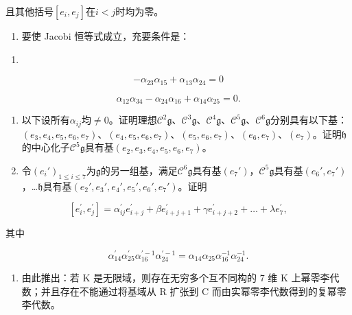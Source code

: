 且其他括号\([e_i, e_j]\)在\(i < j\)时均为零。

\begin{enumerate}
\def\labelenumi{(\alph{enumi})}
\tightlist
\item
  要使 Jacobi 恒等式成立，充要条件是：
\end{enumerate}

\begin{enumerate}
\def\labelenumi{(\arabic{enumi})}
\setcounter{enumi}{1}
\tightlist
\item
\end{enumerate}

\[
- \alpha_ {2 3} \alpha_ {1 5} + \alpha_ {1 3} \alpha_ {2 4} = 0\tag{2}
\]

\[
\alpha_ {1 2} \alpha_ {3 4} - \alpha_ {2 4} \alpha_ {1 6} + \alpha_ {1 4} \alpha_ {2 5} = 0.\tag{3}
\]

\begin{enumerate}
\def\labelenumi{(\alph{enumi})}
\setcounter{enumi}{1}
\item
  以下设所有\(\alpha_{ij}\)均\(\neq 0\)。证明理想\(\mathcal{C}^2\mathfrak{g}\)、\(\mathcal{C}^3\mathfrak{g}\)、\(\mathcal{C}^4\mathfrak{g}\)、\(\mathcal{C}^5\mathfrak{g}\)、\(\mathcal{C}^6\mathfrak{g}\)分别具有以下基：\((e_3, e_4, e_5, e_6, e_7)\)、\((e_4, e_5, e_6, e_7)\)、\((e_5, e_6, e_7)\)、\((e_6, e_7)\)、\((e_7)\)。证明\(\mathfrak{h}\)的中心化子\(\mathcal{C}^5\mathfrak{g}\)具有基\((e_2, e_3, e_4, e_5, e_6, e_7)\)。
\item
  令\((e_i')_{1 \leqslant i \leqslant 7}\)为\(\mathfrak{g}\)的另一组基，满足\(\mathcal{C}^6\mathfrak{g}\)具有基\((e_7')\)，\(\mathcal{C}^5\mathfrak{g}\)具有基\((e_6', e_7')\)，\ldots\(\mathfrak{h}\)具有基\((e_2', e_3', e_4', e_5', e_6', e_7')\)。证明
\end{enumerate}

\[
\left[ e _ {i} ^ {\prime}, e _ {j} ^ {\prime} \right] = \alpha_ {i j} ^ {\prime} e _ {i + j} ^ {\prime} + \beta e _ {i + j + 1} ^ {\prime} + \gamma e _ {i + j + 2} ^ {\prime} + \dots + \lambda e _ {7} ^ {\prime},
\]

其中

\[
\alpha_ {1 4} ^ {\prime} \alpha_ {2 5} ^ {\prime} \alpha_ {1 6} ^ {\prime - 1} \alpha_ {2 4} ^ {\prime - 1} = \alpha_ {1 4} \alpha_ {2 5} \alpha_ {1 6} ^ {- 1} \alpha_ {2 4} ^ {- 1}.
\]

\begin{enumerate}
\def\labelenumi{(\alph{enumi})}
\setcounter{enumi}{3}
\tightlist
\item
  由此推出：若 K 是无限域，则存在无穷多个互不同构的 7 维 K 上幂零李代数；并且存在不能通过将基域从 R 扩张到 C 而由实幂零李代数得到的复幂零李代数。
\end{enumerate}

